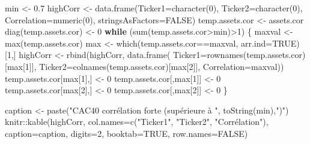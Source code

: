 \documentclass[
]{article}
\newenvironment{Shaded}{\begin{snugshade}}{\end{snugshade}}
\newcommand{\AttributeTok}[1]{\textcolor[rgb]{0.77,0.63,0.00}{#1}}
\newcommand{\ConstantTok}[1]{\textcolor[rgb]{0.00,0.00,0.00}{#1}}
\newcommand{\ControlFlowTok}[1]{\textcolor[rgb]{0.13,0.29,0.53}{\textbf{#1}}}
\newcommand{\DecValTok}[1]{\textcolor[rgb]{0.00,0.00,0.81}{#1}}
\newcommand{\FloatTok}[1]{\textcolor[rgb]{0.00,0.00,0.81}{#1}}
\newcommand{\FunctionTok}[1]{\textcolor[rgb]{0.00,0.00,0.00}{#1}}
\newcommand{\NormalTok}[1]{#1}
\newcommand{\OtherTok}[1]{\textcolor[rgb]{0.56,0.35,0.01}{#1}}
\newcommand{\SpecialCharTok}[1]{\textcolor[rgb]{0.00,0.00,0.00}{#1}}
\newcommand{\StringTok}[1]{\textcolor[rgb]{0.31,0.60,0.02}{#1}}
\begin{document}
\begin{Shaded}
\begin{Highlighting}[]
\NormalTok{min }\OtherTok{\textless{}{-}} \FloatTok{0.7}
\NormalTok{highCorr }\OtherTok{\textless{}{-}} \FunctionTok{data.frame}\NormalTok{(}\AttributeTok{Ticker1=}\FunctionTok{character}\NormalTok{(}\DecValTok{0}\NormalTok{), }
                       \AttributeTok{Ticker2=}\FunctionTok{character}\NormalTok{(}\DecValTok{0}\NormalTok{), }
                       \AttributeTok{Correlation=}\FunctionTok{numeric}\NormalTok{(}\DecValTok{0}\NormalTok{), }
                       \AttributeTok{stringsAsFactors=}\ConstantTok{FALSE}\NormalTok{)}
\NormalTok{temp.assets.cor }\OtherTok{\textless{}{-}}\NormalTok{ assets.cor}
\FunctionTok{diag}\NormalTok{(temp.assets.cor) }\OtherTok{\textless{}{-}} \DecValTok{0}
\ControlFlowTok{while}\NormalTok{ (}\FunctionTok{sum}\NormalTok{(temp.assets.cor}\SpecialCharTok{\textgreater{}}\NormalTok{min)}\SpecialCharTok{\textgreater{}}\DecValTok{1}\NormalTok{) \{}
\NormalTok{  maxval }\OtherTok{\textless{}{-}} \FunctionTok{max}\NormalTok{(temp.assets.cor)}
\NormalTok{  max }\OtherTok{\textless{}{-}} \FunctionTok{which}\NormalTok{(temp.assets.cor}\SpecialCharTok{==}\NormalTok{maxval, }\AttributeTok{arr.ind=}\ConstantTok{TRUE}\NormalTok{)[}\DecValTok{1}\NormalTok{,]}
\NormalTok{  highCorr }\OtherTok{\textless{}{-}} \FunctionTok{rbind}\NormalTok{(highCorr, }\FunctionTok{data.frame}\NormalTok{(}
    \AttributeTok{Ticker1=}\FunctionTok{rownames}\NormalTok{(temp.assets.cor)[max[}\DecValTok{1}\NormalTok{]], }
    \AttributeTok{Ticker2=}\FunctionTok{colnames}\NormalTok{(temp.assets.cor)[max[}\DecValTok{2}\NormalTok{]], }
    \AttributeTok{Correlation=}\NormalTok{maxval))}
\NormalTok{  temp.assets.cor[max[}\DecValTok{1}\NormalTok{],] }\OtherTok{\textless{}{-}} \DecValTok{0}
\NormalTok{  temp.assets.cor[,max[}\DecValTok{1}\NormalTok{]] }\OtherTok{\textless{}{-}} \DecValTok{0}
\NormalTok{  temp.assets.cor[max[}\DecValTok{2}\NormalTok{],] }\OtherTok{\textless{}{-}} \DecValTok{0}
\NormalTok{  temp.assets.cor[,max[}\DecValTok{2}\NormalTok{]] }\OtherTok{\textless{}{-}} \DecValTok{0}
\NormalTok{\}}

\NormalTok{caption }\OtherTok{\textless{}{-}} \FunctionTok{paste}\NormalTok{(}\StringTok{"CAC40 corrélation forte (supérieure à "}\NormalTok{, }
                 \FunctionTok{toString}\NormalTok{(min),}\StringTok{")"}\NormalTok{)}
\NormalTok{knitr}\SpecialCharTok{::}\FunctionTok{kable}\NormalTok{(highCorr, }
             \AttributeTok{col.names=}\FunctionTok{c}\NormalTok{(}\StringTok{"Ticker1"}\NormalTok{, }\StringTok{"Ticker2"}\NormalTok{, }\StringTok{"Corrélation"}\NormalTok{), }
             \AttributeTok{caption=}\NormalTok{caption,}
             \AttributeTok{digits=}\DecValTok{2}\NormalTok{, }\AttributeTok{booktab=}\ConstantTok{TRUE}\NormalTok{, }\AttributeTok{row.names=}\ConstantTok{FALSE}\NormalTok{)}
\end{Highlighting}
\end{Shaded}
\end{document}
